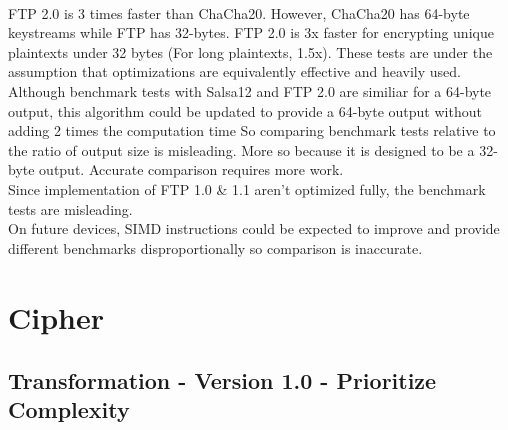 \documentclass[11pt]{article}
\theoremstyle{definition}
\theoremstyle{remark}
\begin{document}
\\
FTP 2.0 is 3 times faster than ChaCha20. However, ChaCha20 has 64-byte keystreams while FTP has 32-bytes. FTP 2.0 is 3x faster for encrypting unique plaintexts under 32 bytes (For long plaintexts, 1.5x). These tests are under the assumption that optimizations are equivalently effective and heavily used. Although benchmark tests with Salsa12 and FTP 2.0 are similiar for a 64-byte output, this algorithm could be updated to provide a 64-byte output without adding 2 times the computation time So comparing benchmark tests relative to the ratio of output size is misleading. More so because it is designed to be a 32-byte output. Accurate comparison requires more work.\\
Since implementation of FTP 1.0 \& 1.1 aren't optimized fully, the benchmark tests are misleading.\\
On future devices, SIMD instructions could be expected to improve and provide different benchmarks disproportionally so comparison is inaccurate.

\section {Cipher}

\subsection{Transformation - Version 1.0 - Prioritize Complexity}
\end{document}
